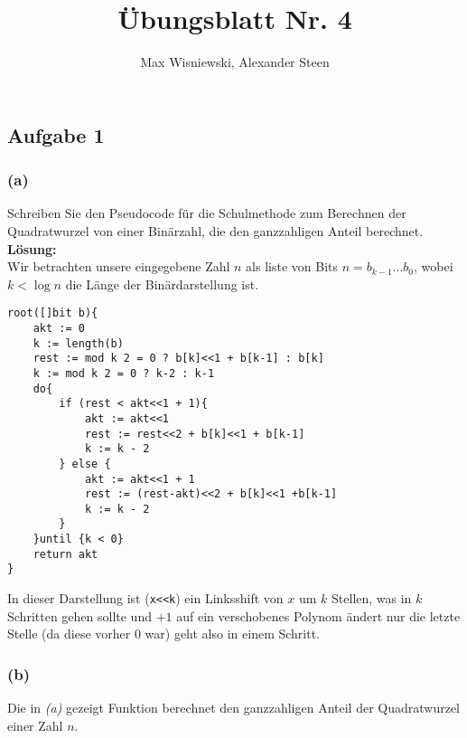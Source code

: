\documentclass[11pt,a4paper,ngerman]{article}
\date{}
\title{Übungsblatt Nr. 4}
\author{Max Wisniewski, Alexander Steen}
\begin{document}
\renewcommand{\figurename}{Figure}
\maketitle
\thispagestyle{fancy}

\subsection*{Aufgabe 1}

\subsubsection*{(a)}

Schreiben Sie den Pseudocode für die Schulmethode zum Berechnen der Quadratwurzel von einer Binärzahl, die den ganzzahligen Anteil berechnet.\\

\textbf{Lösung:}\\

Wir betrachten unsere eingegebene Zahl $n$ als liste von Bits $n=b_{k-1}...b_0$, wobei $k < \log n$ die Länge der Binärdarstellung ist.

\begin{lstlisting}
root([]bit b){
    akt := 0
    k := length(b)
    rest := mod k 2 = 0 ? b[k]<<1 + b[k-1] : b[k]
    k := mod k 2 = 0 ? k-2 : k-1
    do{
        if (rest < akt<<1 + 1){
            akt := akt<<1
            rest := rest<<2 + b[k]<<1 + b[k-1]
            k := k - 2
        } else {
            akt := akt<<1 + 1
            rest := (rest-akt)<<2 + b[k]<<1 +b[k-1]
            k := k - 2
        }
    }until {k < 0}
    return akt 
}
\end{lstlisting}

In dieser Darstellung ist (\lstinline|x<<k|) ein Linksshift von $x$ um $k$ Stellen, was in $k$ Schritten gehen sollte und $+1$ auf ein verschobenes
Polynom ändert nur die letzte Stelle (da diese vorher 0 war) geht also in einem Schritt.\\

\subsubsection*{(b)}

Die in \emph{(a)} gezeigt Funktion berechnet den ganzzahligen Anteil der Quadratwurzel einer Zahl $n$.\\
\end{document}
